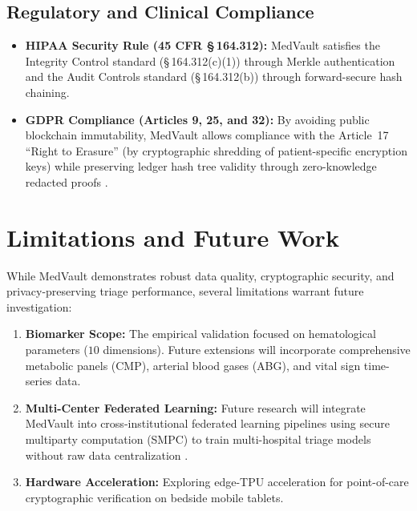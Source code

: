 \documentclass[conference]{IEEEtran}
\begin{document}
\subsection{Regulatory and Clinical Compliance}
\begin{itemize}
    \item \textbf{HIPAA Security Rule (45 CFR \S\,164.312):} MedVault satisfies the Integrity Control standard (\S\,164.312(c)(1)) through Merkle authentication and the Audit Controls standard (\S\,164.312(b)) through forward-secure hash chaining.
    \item \textbf{GDPR Compliance (Articles 9, 25, and 32):} By avoiding public blockchain immutability, MedVault allows compliance with the Article~17 ``Right to Erasure'' (by cryptographic shredding of patient-specific encryption keys) while preserving ledger hash tree validity through zero-knowledge redacted proofs \cite{voigt2017eu}.
\end{itemize}

\section{Limitations and Future Work}
\label{sec:limitations}
While MedVault demonstrates robust data quality, cryptographic security, and privacy-preserving triage performance, several limitations warrant future investigation:
\begin{enumerate}
    \item \textbf{Biomarker Scope:} The empirical validation focused on hematological parameters ($10$ dimensions). Future extensions will incorporate comprehensive metabolic panels (CMP), arterial blood gases (ABG), and vital sign time-series data.
    \item \textbf{Multi-Center Federated Learning:} Future research will integrate MedVault into cross-institutional federated learning pipelines using secure multiparty computation (SMPC) to train multi-hospital triage models without raw data centralization \cite{rieke2020future}.
    \item \textbf{Hardware Acceleration:} Exploring edge-TPU acceleration for point-of-care cryptographic verification on bedside mobile tablets.
\end{enumerate}
\end{document}
